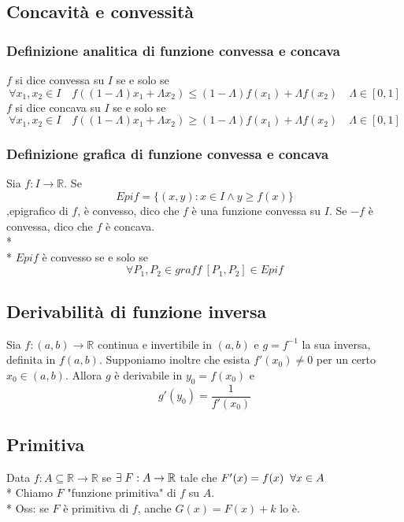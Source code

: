 \documentclass[12pt]{article}
\begin{document}
\subsection{Concavità e convessità}
\subsubsection{Definizione analitica di funzione convessa e concava}
$f$ si dice convessa su $I$ se e solo se
\[\forall x_1,x_2 \in I \quad f((1-\Lambda)x_1+\Lambda x_2) \leq (1-\Lambda)f(x_1) + \Lambda f(x_2) \quad \Lambda \in [0,1]\]
$f$ si dice concava su $I$ se e solo se
\[\forall x_1,x_2 \in I \quad f((1-\Lambda)x_1+\Lambda x_2) \geq (1-\Lambda)f(x_1) + \Lambda f(x_2) \quad \Lambda \in [0,1]\]

\subsubsection{Definizione grafica di funzione convessa e concava}
Sia $f: I \to \mathbb{R}$. Se 
\[Epif = \{(x,y): x \in I \wedge y \geq f(x)\}\]
,epigrafico di $f$, è convesso, dico che $f$ è una funzione convessa su $I$. Se $-f$ è convessa, dico che $f$ è concava.\\* \\*
$Epif$ è convesso se e solo se
\[ \forall P_1,P_2 \in graff\ [P_1, P_2] \in Epif \]

\subsection{Derivabilità di funzione inversa}
Sia $f: (a,b) \to \mathbb{R}$ continua e invertibile in $(a,b)$ e $g = f^{-1}$ la sua inversa, definita in $f(a,b)$. Supponiamo inoltre che esista $f'(x_0) \neq 0$ per un certo $x_0 \in (a,b)$. Allora $g$ è derivabile in $y_0 = f(x_0)$ e
\[ g'(y_0) = \frac{1}{f'(x_0)} \]

\subsection{Primitiva}
Data $f: A\subseteq \mathbb{R} \to \mathbb{R}$ se $\exists \hspace*{0.1cm} F: A \to \mathbb{R}$
tale che $F'(x) = f(x) \hspace*{0.2cm} \forall x \in A$\\*
Chiamo $F$ "funzione primitiva" di $f$ su $A$.\\*
Oss: se $F$ è primitiva di $f$, anche $G(x) = F(x) + k$ lo è.
\end{document}
